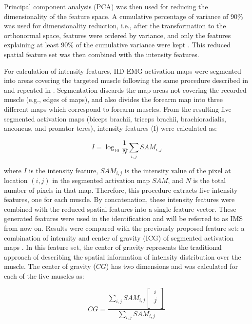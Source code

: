 Principal component analysis (PCA) was then used for reducing the dimensionality of the feature space. A cumulative percentage of variance of 90\% was used for dimensionality reduction, i.e., after the transformation to the orthonormal space, features were ordered by variance, and only the features explaining at least 90\% of the cumulative variance were kept \citep{Valle1999}. This reduced spatial feature set was then combined with the intensity features.

For calculation of intensity features, HD-EMG activation maps were segmented into areas covering the targeted muscle following the same procedure described in \citep{Rojas-Martinez2012} and repeated in \citep{Rojas-Martinez2013}. Segmentation discards the map areas not covering the recorded muscle (e.g., edges of maps), and also divides the forearm map into three different maps which correspond to forearm muscles. From the resulting five segmented activation maps (biceps brachii, triceps brachii, brachioradialis, anconeus, and pronator teres), intensity features (I) were calculated as:

\begin{equation} \label{eq:3-3}
I = \log_{10} \frac{1}{N} \displaystyle\sum_{i,j} SAM_{i,j}
\end{equation}

where $I$ is the intensity feature, $SAM_{i,j}$ is the intensity value of the pixel at location $(i,j)$ in the segmented activation map $SAM$, and $N$ is the total number of pixels in that map. Therefore, this procedure extracts five intensity features, one for each muscle. By concatenation, these intensity features were combined with the reduced spatial features into a single feature vector. These generated features were used in the identification and will be referred to as IMS from now on.
Results were compared with the previously proposed feature set: a combination of intensity and center of gravity (ICG) of segmented activation maps \citep{Jordanic2016a, Jordanic2016b, Rojas-Martinez2013}. In this feature set, the center of gravity represents the traditional approach of describing the spatial information of intensity distribution over the muscle. The center of gravity ($CG$) has two dimensions and was calculated for each of the five muscles as:

\begin{equation} \label{eq:3-4}
CG = \frac{\displaystyle\sum_{i,j} SAM_{i,j} 
	\begin{bmatrix}
	  \, i \,\\
	  \, j \,\\
	\end{bmatrix}
	}{\displaystyle\sum_{i,j} SAM_{i,j}}
\end{equation}

